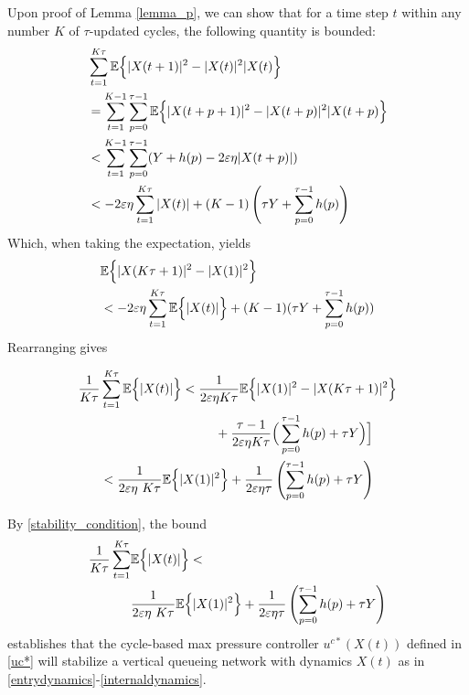 Upon proof of Lemma \ref{lemma_p}, we can show that for a time step $t$ within any number $K$ of $\tau$-updated cycles, the following quantity is bounded:
\begin{align} \nonumber 
&\sum_{t = 1}^{K \tau} \expectation{\vert X(t + 1)\vert^2 - \vert X(t)\vert^2 \vert X(t)}\\ \nonumber
&=\sum_{t=1}^{K-1} \sum_{p=0 }^{\tau - 1} \expectation{\vert X(t + p + 1)\vert^2 - \vert X(t + p)\vert^2 \vert X(t + p)}\\ \nonumber
&< \sum_{t=1}^{K-1} \sum_{p=0 }^{\tau - 1} (Y+ h(p) -2\varepsilon\eta \vert X(t + p )\vert ) \\
&< -2\varepsilon \eta \sum_{t=1}^{K \tau} \vert X(t )\vert  + (K - 1) \left(\tau Y+\sum_{p=0 }^{\tau - 1} h(p) \right) \label{equivalencestabcycleMP}
\end{align}
Which, when taking the expectation, yields
\begin{align} \nonumber 
& \mathbb{E}\Big\{ \vert X(K \tau + 1)\vert^2 - \vert X(1)\vert^2  \Big\} \\
& <  -2\varepsilon\eta \sum_{t=1}^{K \tau} \mathbb{E}\Big\{ \vert X(t )\vert \Big\}+ (K - 1) ( \tau Y+\sum_{p=0 }^{\tau - 1} h(p) )
\end{align}
Rearranging gives
\begin{small}
\begin{align} \nonumber 
\dfrac{1}{K \tau}& \sum_{t=1}^{K \tau}  \mathbb{E}\Big\{ \vert X(t )\vert \Big\} < \frac{1}{2\varepsilon\eta K \tau} \mathbb{E}\Big\{ \vert X(1)\vert^2 - \vert X(K \tau + 1)\vert^2   \Big\} \\
&  \qquad \qquad \qquad \qquad \quad + \frac{\tau-1}{2\varepsilon\eta K\tau }   \Big(\sum_{p=0 }^{\tau - 1} h(p) + \tau Y \Big) \Big] \\
&< \dfrac{1}{2\varepsilon\eta\ K \tau}\mathbb{E}\Big\{ \vert X( 1)\vert^2 \Big\} + \dfrac{ 1}{2\varepsilon\eta \tau} \left(\sum_{p=0 }^{\tau - 1} h(p) + \tau Y\right)
\end{align}
\end{small}
By \eqref{stability_condition}, the bound 
\begin{align} \label{CYCLE_BOUNDS}
\dfrac{1}{K \tau} \sum_{t=1}^{K \tau}  &\expectation{\vert X(t )\vert} < \\ \nonumber
& \frac{1}{2\varepsilon\eta\ K\tau }\expectation{\vert X( 1)\vert^2} + \frac{ 1}{2\varepsilon\eta \tau} \left(\sum_{p=0 }^{\tau - 1} h(p) + \tau Y\right) 
\end{align}
establishes that the cycle-based max pressure controller $u^{c*}(X(t))$ defined in \eqref{uc*} will stabilize a vertical queueing network with dynamics $X(t)$  as in \eqref{entrydynamics}-\eqref{internaldynamics}. 


